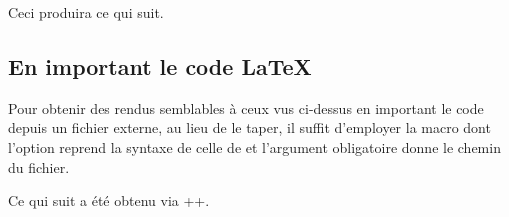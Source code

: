 

\begin{bdocexa}
	\leavevmode


	Ceci produira ce qui suit.

	\medskip

	
\end{bdocexa}




\subsection{En important le code \LaTeX}

\begin{bdocexa*}
	Pour obtenir des rendus semblables à ceux vus ci-dessus en important le code depuis un fichier externe, au lieu de le taper, il suffit d'employer la macro  dont l'option reprend la syntaxe de celle de  et l'argument obligatoire donne le chemin du fichier.
	
	\smallskip
	
	Ce qui suit a été obtenu via \bdocinlatex++.
	
	\medskip
	
\end{bdocexa*}



